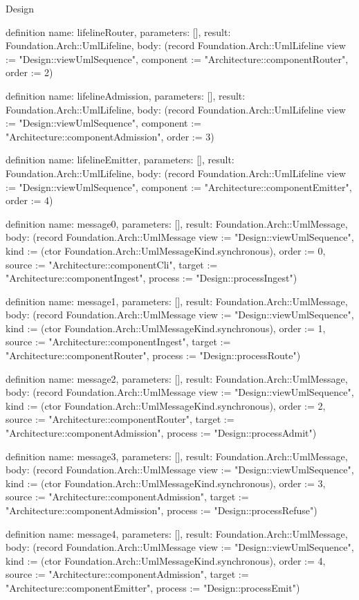 \begin{lexlean}{Design}
\begin{semanticmodule}
definition{
  name: lifelineRouter,
  parameters: [],
  result: Foundation.Arch::UmlLifeline,
  body: (record Foundation.Arch::UmlLifeline {view := "Design::viewUmlSequence", component := "Architecture::componentRouter", order := 2})
}

definition{
  name: lifelineAdmission,
  parameters: [],
  result: Foundation.Arch::UmlLifeline,
  body: (record Foundation.Arch::UmlLifeline {view := "Design::viewUmlSequence", component := "Architecture::componentAdmission", order := 3})
}

definition{
  name: lifelineEmitter,
  parameters: [],
  result: Foundation.Arch::UmlLifeline,
  body: (record Foundation.Arch::UmlLifeline {view := "Design::viewUmlSequence", component := "Architecture::componentEmitter", order := 4})
}

definition{
  name: message0,
  parameters: [],
  result: Foundation.Arch::UmlMessage,
  body: (record Foundation.Arch::UmlMessage {view := "Design::viewUmlSequence", kind := (ctor Foundation.Arch::UmlMessageKind.synchronous), order := 0, source := "Architecture::componentCli", target := "Architecture::componentIngest", process := "Design::processIngest"})
}

definition{
  name: message1,
  parameters: [],
  result: Foundation.Arch::UmlMessage,
  body: (record Foundation.Arch::UmlMessage {view := "Design::viewUmlSequence", kind := (ctor Foundation.Arch::UmlMessageKind.synchronous), order := 1, source := "Architecture::componentIngest", target := "Architecture::componentRouter", process := "Design::processRoute"})
}

definition{
  name: message2,
  parameters: [],
  result: Foundation.Arch::UmlMessage,
  body: (record Foundation.Arch::UmlMessage {view := "Design::viewUmlSequence", kind := (ctor Foundation.Arch::UmlMessageKind.synchronous), order := 2, source := "Architecture::componentRouter", target := "Architecture::componentAdmission", process := "Design::processAdmit"})
}

definition{
  name: message3,
  parameters: [],
  result: Foundation.Arch::UmlMessage,
  body: (record Foundation.Arch::UmlMessage {view := "Design::viewUmlSequence", kind := (ctor Foundation.Arch::UmlMessageKind.synchronous), order := 3, source := "Architecture::componentAdmission", target := "Architecture::componentAdmission", process := "Design::processRefuse"})
}

definition{
  name: message4,
  parameters: [],
  result: Foundation.Arch::UmlMessage,
  body: (record Foundation.Arch::UmlMessage {view := "Design::viewUmlSequence", kind := (ctor Foundation.Arch::UmlMessageKind.synchronous), order := 4, source := "Architecture::componentAdmission", target := "Architecture::componentEmitter", process := "Design::processEmit"})
}


\end{semanticmodule}
\end{lexlean}
